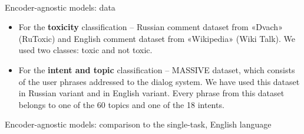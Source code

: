 ​
\begin{frame}{Encoder-agnostic models: data}
\begin{itemize}
    \item For the \textbf{toxicity} classification -- Russian comment dataset from «Dvach» (RuToxic) and English comment dataset from  «Wikipedia» (Wiki Talk). We used two classes: toxic and not toxic.
    \item For the \textbf{intent and topic} classification -- MASSIVE dataset, which consists of the user phrases addressed to the dialog system. We have used this dataset in Russian variant and in English variant. Every phrase from this dataset belongs to one of the 60 topics and one of the 18 intents. 
\end{itemize}
\end{frame}



\begin{frame}{Encoder-agnostic models: comparison to the single-task, English language}
\begin{table}[htbp]
\centering
\caption{Accuracy / F1-macro on the English data for the encoder-agnostic transformer-based model. English cased models trained on English data. Mode S stands for single-task, and mode M stands for multi-task.}
 \end{table}
 \end{frame}




